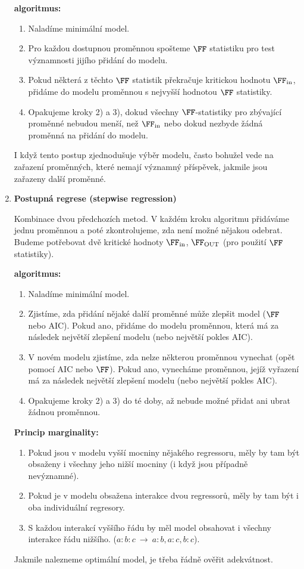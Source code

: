 \begin{enumerate}[1)]
\textbf{algoritmus:}\begin{enumerate}[	1)]
	\item Naladíme minimální model.
	\item Pro každou dostupnou proměnnou spošteme $\FF$ statistiku pro test významnosti jijího přidání do modelu.
	\item Pokud některá z těchto $\FF$ statistik překračuje kritickou hodnotu $\FF_\mathrm{in}$, přidáme do modelu proměnnou s nejvyšší hodnotou $\FF$ statistiky.
	\item Opakujeme kroky 2) a 3), dokud všechny $\FF$-statistiky pro zbývající proměnné nebudou menší, než $\FF_\mathrm{in}$ nebo dokud nezbyde žádná proměnná na přidání do modelu.
\end{enumerate}
\begin{remark}
	I když tento postup zjednodušuje výběr modelu, často bohužel vede na zařazení proměnných, které nemají významný příspěvek, jakmile jsou zařazeny další proměnné.
\end{remark}

\item
\textbf{Postupná regrese (stepwise regression)}

Kombinace dvou předchozích metod. V každém kroku algoritmu přidáváme jednu proměnnou a poté zkontrolujeme, zda není možné nějakou odebrat. Budeme potřebovat  dvě kritické hodnoty $\FF_\mathrm{in}$, $\FF_\mathrm{OUT}$ (pro použití $\FF$ statistiky).

\textbf{algoritmus:}\begin{enumerate}[	1)]
	\item Naladíme minimální model.
	\item Zjistíme, zda přidání nějaké další proměnné může zlepšit model ($\FF$ nebo AIC). Pokud ano, přidáme do modelu proměnnou, která má za následek největší zlepšení modelu (nebo největší pokles AIC).
	\item V novém modelu zjistíme, zda nelze některou proměnnou vynechat (opět pomocí AIC nebo $\FF$). Pokud ano, vynecháme proměnnou, jejíž vyřazení má za následek největší zlepšení modelu (nebo největší pokles AIC).
	\item Opakujeme kroky 2) a 3) do té doby, až nebude možné přidat ani ubrat žádnou proměnnou.
\end{enumerate}

\textbf{Princip marginality:}
\begin{enumerate}[	1)]
	\item Pokud jsou v modelu vyšší mocniny nějakého regressoru, měly by tam být obsaženy i všechny jeho nižší mocniny (i když jsou případně nevýznamné).
	\item Pokud je v modelu obsažena interakce dvou regressorů, měly by tam být i oba individuální regresory.
	\item S každou interakcí vyššího řádu by měl model obsahovat i všechny interakce řádu nižšího. ($a:b:c~\to~a:b,a:c,b:c$).
\end{enumerate}

\begin{remark}
	Jakmile nalezneme optimální model, je třeba řádně ověřit adekvátnost.
\end{remark}

\end{enumerate}

